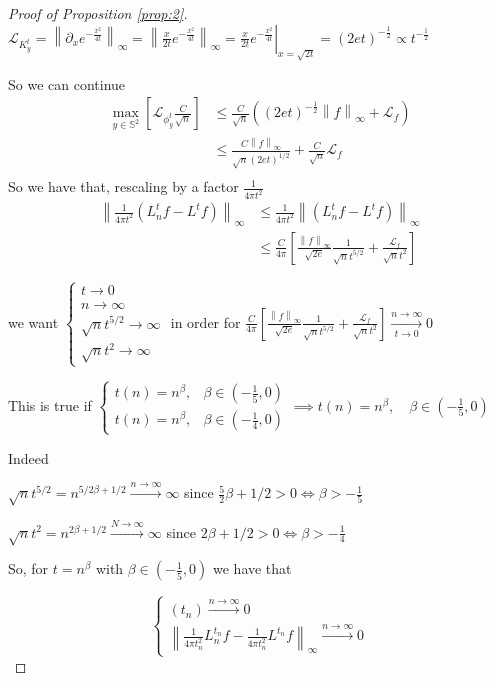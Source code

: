 \documentclass{article} %
\newcommand{\norm}[1]{\left\lVert#1\right\rVert}
\begin{document}
\begin{proof}[Proof of Proposition \ref{prop:2}]
$\mathcal L_{K^t_y} = \norm{\partial_x e^{-\frac{x^2}{4t}}}_\infty = \norm{\frac{x}{2t}e^{-\frac{x^2}{4t}}}_\infty = \left. \frac{x}{2t}e^{-\frac{x^2}{4t}}\right|_{x=\sqrt{2t}}=(2et)^{-\frac{1}{2}}\propto t ^ {-\frac{1}{2}}$

So we can continue
$$\begin{aligned}
	\max _{y\in \mathbb S^2} \left[  \mathcal L_{\phi^t_y} \frac{C}{\sqrt{n}} \right]
	&\leq  \frac{C}{\sqrt{n}} \left( (2et)^{-\frac{1}{2}} \norm{f}_\infty + \mathcal L_f \right)\\
	&\leq \frac{C\norm{f}_\infty}{\sqrt{n}(2et)^{1/2}} +   \frac{C}{\sqrt{n}}\mathcal L_f\\
\end{aligned}$$
So we have that, rescaling by a factor $\frac{1}{4\pi t^2}$
\begin{align*}
	\norm{\frac{1}{4\pi t^2}\left(L_n^tf-L^tf\right)}_\infty&\leq \frac{1}{4\pi t^2}\norm{\left(L_n^tf-L^tf\right)}_\infty \\
	&\leq \frac{C}{4\pi}\left[\frac{\norm{f}_\infty}{\sqrt{2e}}\frac{1}{\sqrt{n}t^{5/2}} + \frac{\mathcal L_f}{\sqrt{n}t^2}\right]
\end{align*}

we want $\begin{cases}
t \rightarrow 0\\
n \rightarrow \infty\\
\sqrt{n}t^{5/2} \rightarrow \infty\\
\sqrt{n}t^2 \rightarrow \infty
\end{cases}$ in order for $ \frac{C}{4\pi}\left[\frac{\norm{f}_\infty}{\sqrt{2e}}\frac{1}{\sqrt{n}t^{5/2}} + \frac{\mathcal L_f}{\sqrt{n}t^2}\right] \xrightarrow[t\to 0 ]{n\to\infty}0$

This is true if $\begin{cases}
t(n) = n^\beta, &\beta\in(-\frac{1}{5}, 0) \\
t(n) = n^\beta, &\beta\in(-\frac{1}{4}, 0)
\end{cases} \implies t(n) = n^\beta, \quad \beta\in(-\frac{1}{5}, 0)$

Indeed

$\sqrt{n}t^{5/2}=n^{5/2\beta+1/2}\xrightarrow{n \to \infty} \infty$ since $\frac{5}{2}\beta+1/2>0 \iff \beta>-\frac{1}{5}$

$\sqrt{n}t^2=n^{2\beta+1/2}\xrightarrow {N \to \infty} \infty$ since $2\beta+1/2>0 \iff \beta>-\frac{1}{4}$

So, for $t=n^\beta$ with $\beta\in(-\frac{1}{5}, 0)$ we have that

$$\begin{cases}
(t_n)\xrightarrow{n\to\infty}0\\
\norm{\frac{1}{4\pi t_n^2}L_n^{t_n}f-\frac{1}{4\pi t_n^2}L^{t_n}f}_\infty  \xrightarrow{n\to\infty}0
\end{cases}$$

\end{proof}
\end{document}
